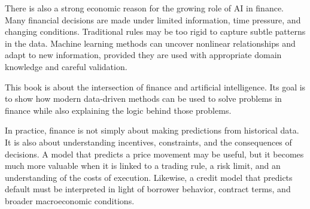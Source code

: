 \documentclass[../ai_in_finance]{subfiles}
\begin{document}
\begin{figure}[htbp]
\centering
\begin{lrbox}{\bookmeasuredbox}
\end{lrbox}
\ifdim\wd\bookmeasuredbox<0.65\linewidth
\setlength{\bookcapwidth}{0.65\linewidth}
\else
\setlength{\bookcapwidth}{\wd\bookmeasuredbox}
\fi
{}
\end{figure}

There is also a strong economic reason for the growing role of AI in finance. Many financial decisions are made under limited information, time pressure, and changing conditions. Traditional rules may be too rigid to capture subtle patterns in the data. Machine learning methods can uncover nonlinear relationships and adapt to new information, provided they are used with appropriate domain knowledge and careful validation.

This book is about the intersection of finance and artificial intelligence. Its goal is to show how modern data-driven methods can be used to solve problems in finance while also explaining the logic behind those problems.

In practice, finance is not simply about making predictions from historical data. It is also about understanding incentives, constraints, and the consequences of decisions. A model that predicts a price movement may be useful, but it becomes much more valuable when it is linked to a trading rule, a risk limit, and an understanding of the costs of execution. Likewise, a credit model that predicts default must be interpreted in light of borrower behavior, contract terms, and broader macroeconomic conditions.
\end{document}
